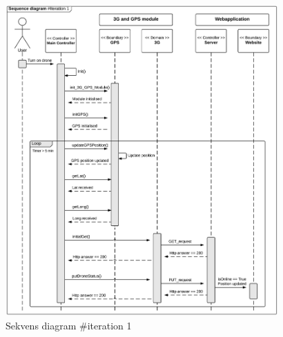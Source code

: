\begin{figure}[H]
	\centering
	\includegraphics[width=0.93\textwidth]{Billeder/sekvens/sekvens_iteration1}
	\caption{Sekvens diagram \#iteration 1}
	\label{fig:Sekvens_diagram_iteration1}
\end{figure}
\newpage


